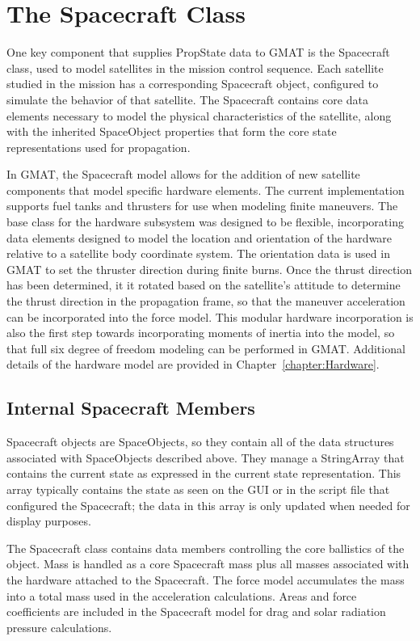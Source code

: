 \section{The Spacecraft Class}

One key component that supplies PropState data to GMAT is the Spacecraft class, used to model
satellites in the mission control sequence.  Each satellite studied in the mission has a
corresponding Spacecraft object, configured to simulate the behavior of that satellite.  The
Spacecraft contains core data elements necessary to model the physical characteristics of the
satellite, along with the inherited SpaceObject properties that form the core state representations
used for propagation.

In GMAT, the Spacecraft model allows for the addition of new satellite components that model
specific hardware elements.  The current implementation supports fuel tanks and thrusters for use
when modeling finite maneuvers.  The base class for the hardware subsystem was designed to be
flexible, incorporating data elements designed to model the location and orientation of the hardware
relative to a satellite body coordinate system.  The orientation data is used in GMAT to set the
thruster direction during finite burns.  Once the thrust direction has been determined, it it
rotated based on the satellite's attitude to determine the thrust direction in the propagation
frame, so that the maneuver acceleration can be incorporated into the force model.  This modular
hardware incorporation is also the first step towards incorporating moments of inertia into the
model, so that full six degree of freedom modeling can be performed in GMAT.  Additional details of
the hardware model are provided in Chapter~\ref{chapter:Hardware}.

\subsection{Internal Spacecraft Members}

Spacecraft objects are SpaceObjects, so they contain all of the data structures associated with
SpaceObjects described above.  They manage a StringArray that contains the current state as
expressed in the current state representation.  This array typically contains the state as seen on
the GUI or in the script file that configured the Spacecraft; the data in this array is only updated
when needed for display purposes.

The Spacecraft class contains data members controlling the core ballistics of the object.  Mass is
handled as a core Spacecraft mass plus all masses associated with the hardware attached to the
Spacecraft.  The force model accumulates the mass into a total mass used in the acceleration
calculations.  Areas and force coefficients are included in the Spacecraft model for drag and solar
radiation pressure calculations.

